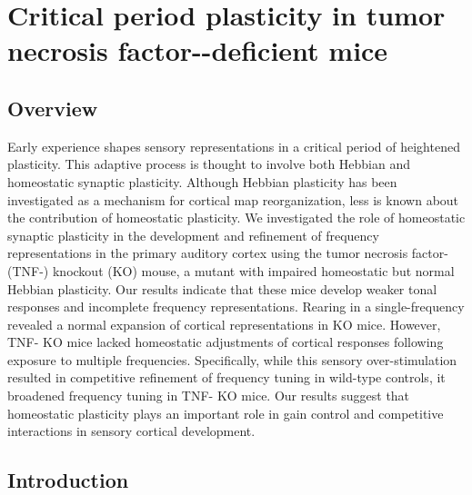 \chapter{Critical period plasticity in tumor necrosis factor-\textalpha{}-deficient mice}

\section{Overview}
\newrefsection

Early experience shapes sensory representations in a critical period of heightened plasticity. This adaptive process is thought to involve both Hebbian and homeostatic synaptic plasticity. Although Hebbian plasticity has been investigated as a mechanism for cortical map reorganization, less is known about the contribution of homeostatic plasticity. We investigated the role of homeostatic synaptic plasticity in the development and refinement of frequency representations in the primary auditory cortex using the tumor necrosis factor-\textalpha{} (TNF-\textalpha{}) knockout (KO) mouse, a mutant with impaired homeostatic but normal Hebbian plasticity. Our results indicate that these mice develop weaker tonal responses and incomplete frequency representations. Rearing in a single-frequency revealed a normal expansion of cortical representations in KO mice. However, TNF-\textalpha{} KO mice lacked homeostatic adjustments of cortical responses following exposure to multiple frequencies. Specifically, while this sensory over-stimulation resulted in competitive refinement of frequency tuning in wild-type controls, it broadened frequency tuning in TNF-\textalpha{} KO mice. Our results suggest that homeostatic plasticity plays an important role in gain control and competitive interactions in sensory cortical development.

\section{Introduction}


